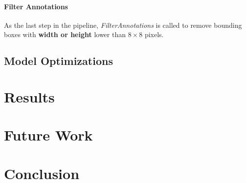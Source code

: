 \subsubsection*{Filter Annotations}

As the last step in the pipeline, \textit{FilterAnnotations} is called to remove
bounding boxes with \textbf{width or height} lower than $8 \times 8$ pixels.


\section{Model Optimizations}



\chapter{Results}





\chapter{Future Work}





\chapter{Conclusion}



% 